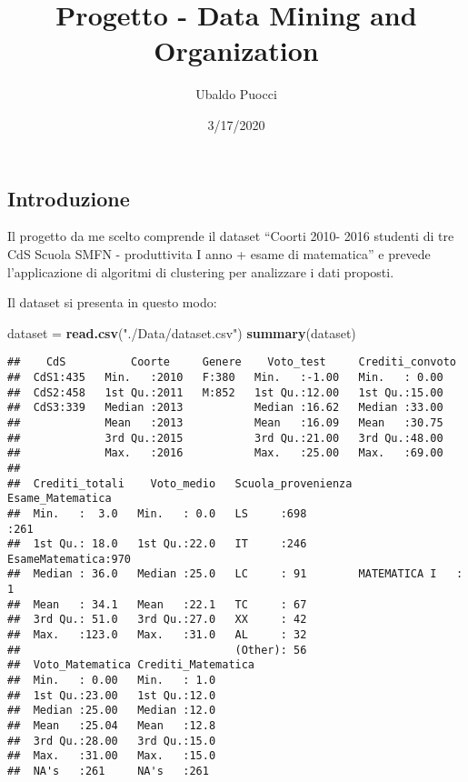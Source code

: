\documentclass[
]{article}
\title{Progetto - Data Mining and Organization}
\author{Ubaldo Puocci}
\date{3/17/2020}
\newenvironment{Shaded}{\begin{snugshade}}{\end{snugshade}}
\newcommand{\KeywordTok}[1]{\textcolor[rgb]{0.13,0.29,0.53}{\textbf{#1}}}
\newcommand{\NormalTok}[1]{#1}
\newcommand{\StringTok}[1]{\textcolor[rgb]{0.31,0.60,0.02}{#1}}
\begin{document}
\maketitle

\hypertarget{introduzione}{%
\subsection{Introduzione}\label{introduzione}}

Il progetto da me scelto comprende il dataset ``Coorti 2010- 2016
studenti di tre CdS Scuola SMFN - produttivita I anno + esame di
matematica'' e prevede l'applicazione di algoritmi di clustering per
analizzare i dati proposti.

Il dataset si presenta in questo modo:

\begin{Shaded}
\begin{Highlighting}[]
\NormalTok{dataset =}\StringTok{ }\KeywordTok{read.csv}\NormalTok{(}\StringTok{"./Data/dataset.csv"}\NormalTok{)}
\KeywordTok{summary}\NormalTok{(dataset)}
\end{Highlighting}
\end{Shaded}

\begin{verbatim}
##    CdS          Coorte     Genere    Voto_test     Crediti_convoto
##  CdS1:435   Min.   :2010   F:380   Min.   :-1.00   Min.   : 0.00  
##  CdS2:458   1st Qu.:2011   M:852   1st Qu.:12.00   1st Qu.:15.00  
##  CdS3:339   Median :2013           Median :16.62   Median :33.00  
##             Mean   :2013           Mean   :16.09   Mean   :30.75  
##             3rd Qu.:2015           3rd Qu.:21.00   3rd Qu.:48.00  
##             Max.   :2016           Max.   :25.00   Max.   :69.00  
##                                                                   
##  Crediti_totali    Voto_medio   Scuola_provenienza        Esame_Matematica
##  Min.   :  3.0   Min.   : 0.0   LS     :698                       :261    
##  1st Qu.: 18.0   1st Qu.:22.0   IT     :246        EsameMatematica:970    
##  Median : 36.0   Median :25.0   LC     : 91        MATEMATICA I   :  1    
##  Mean   : 34.1   Mean   :22.1   TC     : 67                               
##  3rd Qu.: 51.0   3rd Qu.:27.0   XX     : 42                               
##  Max.   :123.0   Max.   :31.0   AL     : 32                               
##                                 (Other): 56                               
##  Voto_Matematica Crediti_Matematica
##  Min.   : 0.00   Min.   : 1.0      
##  1st Qu.:23.00   1st Qu.:12.0      
##  Median :25.00   Median :12.0      
##  Mean   :25.04   Mean   :12.8      
##  3rd Qu.:28.00   3rd Qu.:15.0      
##  Max.   :31.00   Max.   :15.0      
##  NA's   :261     NA's   :261
\end{verbatim}
\end{document}
